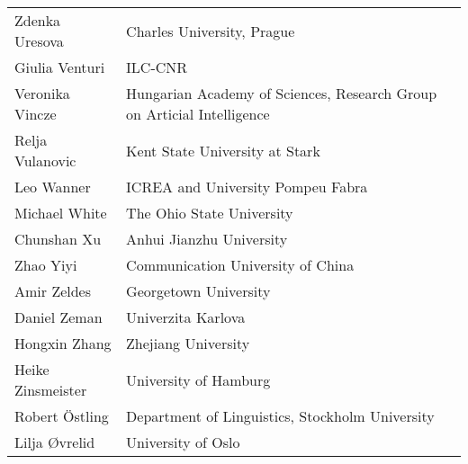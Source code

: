 \documentclass{easychair}
\begin{document}
\begin{longtable}{p{}p{}}
Zdenka Uresova & Charles University, Prague\\
Giulia Venturi & ILC-CNR\\
Veronika Vincze & Hungarian Academy of Sciences, Research Group on Articial Intelligence\\
Relja Vulanovic & Kent State University at Stark\\
Leo Wanner & ICREA and University Pompeu Fabra\\
Michael White & The Ohio State University\\
Chunshan Xu & Anhui Jianzhu University\\
Zhao Yiyi & Communication University of China\\
Amir Zeldes & Georgetown University\\
Daniel Zeman & Univerzita Karlova\\
Hongxin Zhang & Zhejiang University\\
Heike Zinsmeister & University of Hamburg\\
Robert \"Ostling & Department of Linguistics, Stockholm University\\
Lilja {\O}vrelid & University of Oslo\\
\end{longtable}
\end{document}
